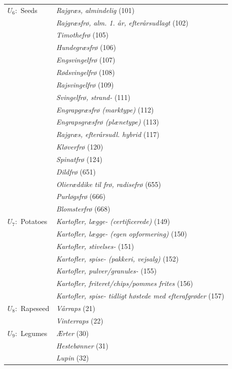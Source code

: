 \documentclass[12pt]{article}
\begin{document}
\begin{longtable}{l | p{9cm}}
$U_6:$ Seeds
       & \textit{Rajgræs, almindelig} (101) \\
       & \textit{Rajgræsfrø, alm. 1. år, efterårsudlagt} (102) \\
       & \textit{Timothefrø} (105) \\
       & \textit{Hundegræsfrø} (106) \\
       & \textit{Engsvingelfrø} (107) \\
       & \textit{Rødsvingelfrø} (108) \\
       & \textit{Rajsvingelfrø} (109) \\
       & \textit{Svingelfrø, strand-} (111) \\
       & \textit{Engrapgræsfrø (marktype)} (112) \\
       & \textit{Engrapsgræsfrø (plænetype)} (113) \\
       & \textit{Rajgræs, efterårsudl. hybrid} (117) \\
       & \textit{Kløverfrø} (120) \\
       & \textit{Spinatfrø} (124) \\
       & \textit{Dildfrø} (651) \\
       & \textit{Olieræddike til frø, radisefrø} (655) \\
       & \textit{Purløgsfrø} (666) \\
       & \textit{Blomsterfrø} (668) \\ \midrule
 
$U_7:$ Potatoes
       & \textit{Kartofler, lægge- (certificerede)} (149) \\
       & \textit{Kartofler, lægge- (egen opformering)} (150) \\
       & \textit{Kartofler, stivelses-} (151) \\
       & \textit{Kartofler, spise- (pakkeri, vejsalg)} (152) \\
       & \textit{Kartofler, pulver/granules-} (155) \\
       & \textit{Kartofler, friteret/chips/pommes frites} (156) \\
       & \textit{Kartofler, spise- tidligt høstede med efterafgrøder} (157) \\ \midrule
 
$U_8:$ Rapeseed
       & \textit{Vårraps} (21) \\
       & \textit{Vinterraps} (22) \\ \midrule
 
$U_9:$ Legumes
       & \textit{Ærter} (30) \\
       & \textit{Hestebønner} (31) \\
       & \textit{Lupin} (32) \\ \midrule
 

\end{longtable}
\end{document}
